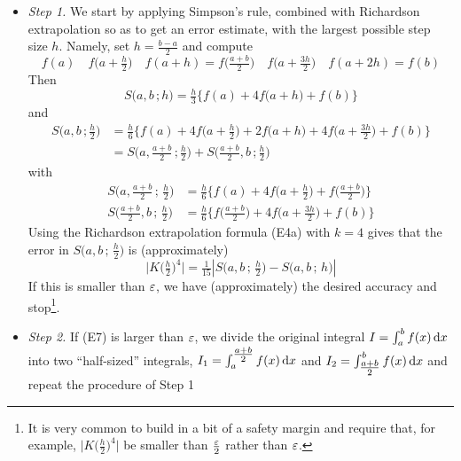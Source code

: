 \begin{itemize}
\item \emph{Step 1.} We start by applying Simpson's rule, combined
with Richardson extrapolation so as to get an error estimate,
with the largest possible step size $h$. Namely, set $h=\tfrac{b-a}{2}$
and compute
\begin{equation*}
f(a)\quad
f\big(a+\tfrac{h}{2}\big)\quad
f(a+h)=f\big(\tfrac{a+b}{2}\big)\quad
f\big(a+\tfrac{3h}{2}\big)\quad
f(a+2h)=f(b)
\end{equation*}
Then
\begin{equation*}
S\big(a,b\,;h\big)
=\tfrac{h}{3}\big\{f(a)+4 f\big(a+h\big)+f(b)\big\}
\end{equation*}
and
\begin{align*}
S\big(a,b\,;\tfrac{h}{2}\big)
&=\tfrac{h}{6}\big\{f(a)+4 f\big(a+\tfrac{h}{2}\big)
                        +2 f\big(a+h\big)
                        +4 f\big(a+\tfrac{3h}{2}\big)
                        +f(b)\big\}
\\
&=S\big(a,\tfrac{a+b}{2}\,;\tfrac{h}{2}\big)
+S\big(\tfrac{a+b}{2},b\,;\tfrac{h}{2}\big)
\end{align*}
with
\begin{align*}
S\big(a,\tfrac{a+b}{2}\,;\,\tfrac{h}{2}\big)
&=\tfrac{h}{6}\big\{f(a)+4 f\big(a+\tfrac{h}{2}\big)
           +f\big(\tfrac{a+b}{2}\big)\big\} \\
S\big(\tfrac{a+b}{2},b\,;\,\tfrac{h}{2}\big)
&=\tfrac{h}{6}\big\{f\big(\tfrac{a+b}{2}\big)+4 f\big(a+\tfrac{3h}{2}\big)
           +f(b)\big\}
\end{align*}
Using the Richardson extrapolation formula (E4a)
with $k=4$ gives that the error in $S\big(a,b\,;\,\tfrac{h}{2}\big)$
is (approximately)
\begin{equation*}
\big|K\big(\tfrac{h}{2}\big)^4\big|=\tfrac{1}{15}\left|
             S\big(a,b\,;\,\tfrac{h}{2}\big)
            -S\big(a,b\,;\,h\big)\right|
\tag{E7}\end{equation*}
If this is smaller than $\varepsilon$, we have (approximately) the desired
accuracy and stop\footnote{It is very common to build in a bit of a safety
margin and require that, for example, $\big|K\big(\tfrac{h}{2}\big)^4\big|$
be smaller than $\tfrac{\varepsilon}{2}$ rather than $\varepsilon$.}.
\item \emph{Step 2.} If (E7) is larger than $\varepsilon$,
we divide the original integral $I=\int_a^b f(x)\,\mathrm{d}x$ into two ``half-sized''
integrals, $I_1=\int_a^{\tfrac{a+b}{2}} f(x)\,\mathrm{d}x$ and
 $I_2=\int_{\tfrac{a+b}{2}}^b f(x)\,\mathrm{d}x$ and repeat the procedure of Step 1

\end{itemize}
